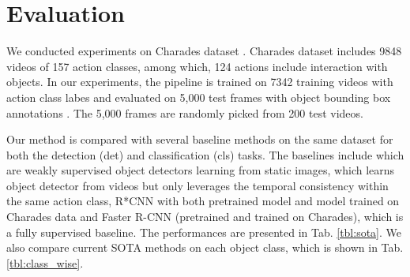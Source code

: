 \section{Evaluation}
\label{sec:evaluation}

We conducted experiments on Charades dataset \cite{sigurdsson2016hollywood}. Charades dataset includes 9848 videos of 157 action classes, among which, 124 actions include interaction with objects. In our experiments, the pipeline is trained on 7342 training videos with action class labes and evaluated on 5,000 test frames with object bounding box annotations \cite{}. The 5,000 frames are randomly picked from 200 test videos. 

Our method is compared with several baseline methods on the same dataset for both the detection (det) and classification (cls) tasks. The baselines include \cite{bilen2016weakly,kantorov2016contextlocnet} which are weakly supervised object detectors learning from static images, \cite{yuan2017temporal} which learns object detector from videos but only leverages the temporal consistency within the same action class, R*CNN \cite{gkioxari2015contextual} with both pretrained model and model trained on Charades data and Faster R-CNN (pretrained and trained on Charades), which is a fully supervised baseline. The performances are presented in Tab. \ref{tbl:sota}. We also compare current SOTA methods on each object class, which is shown in Tab. \ref{tbl:class_wise}.

